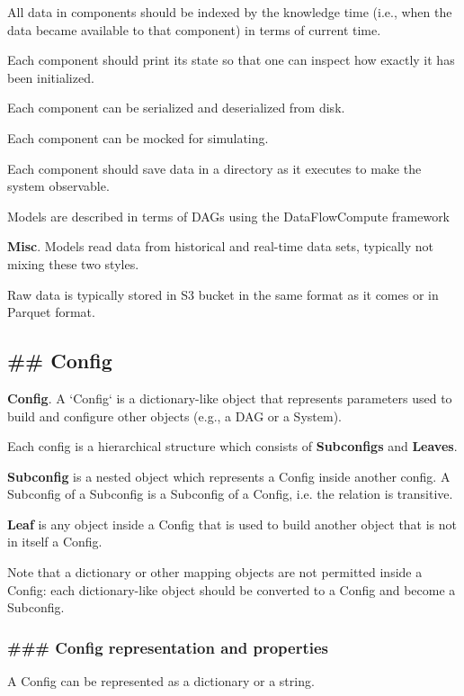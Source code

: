 \documentclass[11pt, reqno]{amsart}
\begin{document}
All data in components should be indexed by the knowledge time (i.e.,
when the data became available to that component) in terms of current
time.

Each component should print its state so that one can inspect how
exactly it has been initialized.

Each component can be serialized and deserialized from disk.

Each component can be mocked for simulating.

Each component should save data in a directory as it executes to make
the system observable.

Models are described in terms of DAGs using the DataFlowCompute
framework

\textbf{Misc}. Models read data from historical and real-time data sets,
typically not mixing these two styles.

Raw data is typically stored in S3 bucket in the same format as it comes
or in Parquet format.

\hypertarget{config}{%
\subsection{\#\# Config}\label{config}}

\textbf{Config}. A `Config` is a dictionary-like object that represents
parameters used to build and configure other objects (e.g., a DAG or a
System).

Each config is a hierarchical structure which consists of
\textbf{Subconfigs} and \textbf{Leaves}.

\textbf{Subconfig} is a nested object which represents a Config inside
another config. A Subconfig of a Subconfig is a Subconfig of a Config,
i.e. the relation is transitive.

\textbf{Leaf} is any object inside a Config that is used to build
another object that is not in itself a Config.

Note that a dictionary or other mapping objects are not permitted inside
a Config: each dictionary-like object should be converted to a Config
and become a Subconfig.

\hypertarget{config-representation-and-properties}{%
\subsubsection{\#\#\# Config representation and
properties}\label{config-representation-and-properties}}

A Config can be represented as a dictionary or a string.
\end{document}
